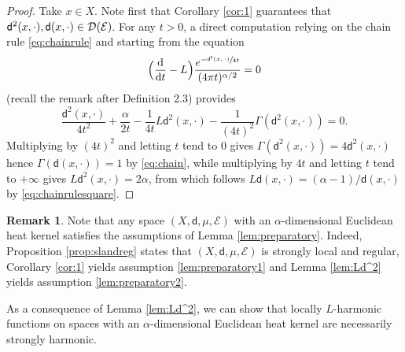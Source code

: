 \documentclass[JEP,XML,SOM,Unicode,published]{cedram}
\newcommand{\NoChangel}[1]{%
\expandafter\let\csname old\string#1\endcsname=#1
\let#1=\relax
\newcommand{#1}{\mathcode`l="716C\csname old\string#1\endcsname\mathcode`l="7160 }%
}
\theoremstyle{plain}
\theoremstyle{definition}
\newtheorem{remark}[theorem]{Remark}
\newcommand{\cE}{\mathcal{E}}
\newcommand{\cD}{\mathcal{D}}
\newcommand{\di}{\mathop{}\!\mathrm{d}}
\newcommand{\loc}{\mathrm{loc}}\NoChangel{\loc}
\newcommand{\dist}{\mathsf{d}}
\begin{document}
\begin{proof}
Take $x\in X$. Note first that Corollary \ref{cor:1} guarantees that $\dist^2(x,\cdot), \dist(x,\cdot) \in \cD_{\loc}(\cE)$. For any $t>0$, a direct computation relying on the chain rule \eqref{eq:chainrule} and starting from the equation
\[
\Bigl(\frac{\di}{\di t} - L \Bigr) \frac{e^{-\sfrac{\dist^2(x,\cdot)}{4t}}}{(4 \pi t)^{\alpha/2}} = 0
\]
(recall the remark after Definition 2.3) provides
\[
\frac{\dist^2(x,\cdot)}{4t^2} + \frac{\alpha}{2t} - \frac{1}{4t}L\dist^2(x,\cdot) - \frac{1}{(4t)^2}\Gamma(\dist^2(x,\cdot)) =0.
\]
Multiplying by $(4t)^2$ and letting $t$ tend to $0$ gives $\Gamma(\dist^2(x,\cdot))=4\dist^2(x,\cdot)$ hence $\Gamma(\dist(x,\cdot))=1$ by \eqref{eq:chain}, while multiplying by $4t$ and letting $t$ tend to $+\infty$ gives $L\dist^2(x,\cdot)=2\alpha$, from which follows $L\dist(x,\cdot)=(\alpha-1)/\dist(x,\cdot)$ by \eqref{eq:chainrulesquare}.
\end{proof}

\begin{remark}\label{rk:applypreparatory}
Note that any space $(X,\dist,\mu,\cE)$ with an $\alpha$-dimensional Euclidean heat kernel satisfies the assumptions of Lemma \ref{lem:preparatory}. Indeed, Proposition \ref{prop:slandreg} states that $(X,\dist,\mu,\cE)$ is strongly local and regular, Corollary \ref{cor:1} yields assumption \eqref{lem:preparatory1} and Lemma \ref{lem:Ld^2} yields assumption \eqref{lem:preparatory2}.
\end{remark}

As a consequence of Lemma \ref{lem:Ld^2}, we can show that locally $L$-harmonic functions on spaces with an $\alpha$-dimensional Euclidean heat kernel are necessarily strongly harmonic.
\end{document}
